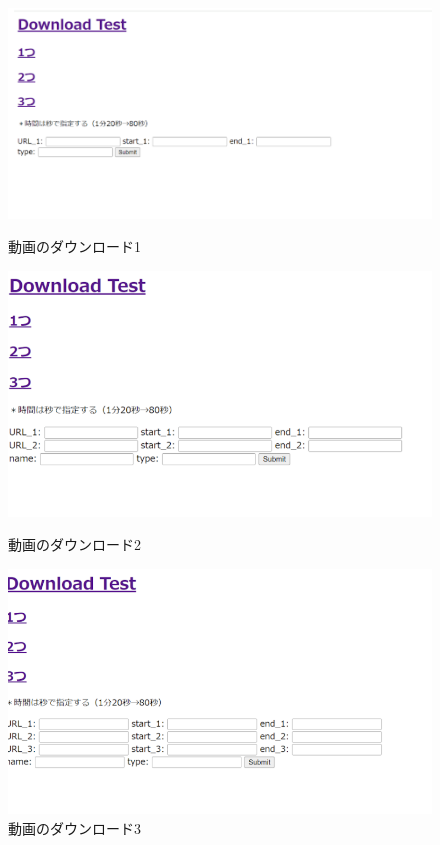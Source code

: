 \begin{figure}
	\centering
	\includegraphics [width=\linewidth]{chap3/fig/test1.png}
	\caption{動画のダウンロード1}
	\label{test1}

	
	\includegraphics [width=\linewidth]{chap3/fig/test2.png}
	\caption{動画のダウンロード2}
	\label{test2}
	
	\includegraphics [width=\linewidth]{chap3/fig/test3.png}
	\caption{動画のダウンロード3}
	\label{test3}
\end{figure}

